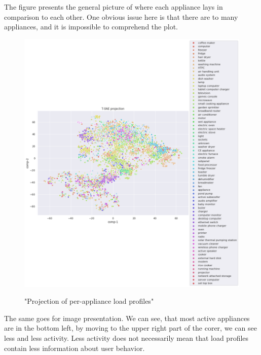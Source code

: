 The figure \label{fig:tsne_papb_scatter_all} presents
the general picture of where each appliance lays in comparison to each other.
One obvious issue here is that there are to many appliances, and it is impossible to comprehend the plot.
\begin{figure}[H]
	\centering
	\caption{"Projection of per-appliance load profiles"}
	\includegraphics[width=1.2\textwidth]{Figures/TSNE/TSNE_results/all/scatter_all_all_lgimgs.png}
	\label{fig:tsne_papb_scatter_all}
\end{figure}

The same goes for image presentation. 
We can see, that most active appliances are in the bottom left,
by moving to the upper right part of the corer, we can see less and less activity.
Less activity does not necessarily mean that load profiles contain less information about user behavior.

